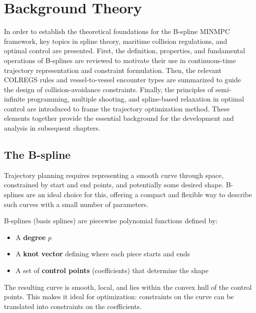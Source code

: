 
\chapter{Background Theory}\label{chap:background-theory}
In order to establish the theoretical foundations for the B-spline MINMPC framework, key topics in spline theory, maritime collision regulations, and optimal control are presented. First, the definition, properties, and fundamental operations of B-splines are reviewed to motivate their use in continuous-time trajectory representation and constraint formulation. Then, the relevant COLREGS rules and vessel-to-vessel encounter types are summarized to guide the design of collision-avoidance constraints. Finally, the principles of semi-infinite programming, multiple shooting, and spline-based relaxation in optimal control are introduced to frame the trajectory optimization method. These elements together provide the essential background for the development and analysis in subsequent chapters.



\section{The B-spline}
\label{sec:b-spline-theory}


Trajectory planning requires representing a smooth curve through space, constrained by start and end points, and potentially some desired shape. B-splines are an ideal choice for this, offering a compact and flexible way to describe such curves with a small number of parameters.

B-splines (basis splines) are piecewise polynomial functions defined by:
\begin{itemize}
    \item A \textbf{degree} \( p \)
    \item A \textbf{knot vector} defining where each piece starts and ends
    \item A set of \textbf{control points} (coefficients) that determine the shape
\end{itemize}

The resulting curve is smooth, local, and lies within the convex hull of the control points. This makes it ideal for optimization: constraints on the curve can be translated into constraints on the coefficients.


